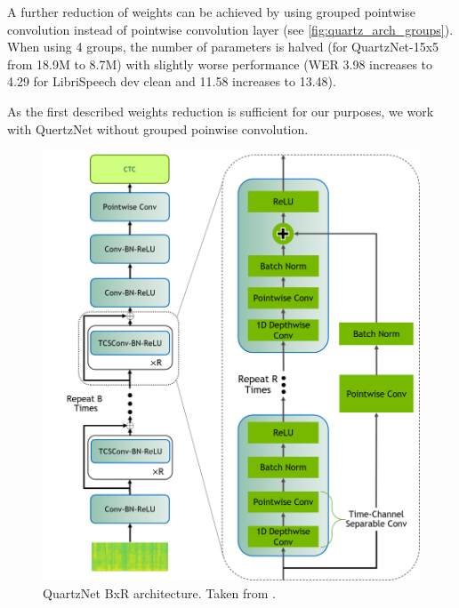 A further reduction of weights can be achieved by using grouped pointwise convolution instead of pointwise convolution layer (see  \cref{fig:quartz_arch_groups}). When using 4 groups, the number of parameters is halved (for QuartzNet-15x5 from 18.9M to 8.7M) with slightly worse performance (WER 3.98 increases to 4.29 for LibriSpeech dev clean and 11.58 increases to 13.48).

As the first described weights reduction is sufficient for our purposes, we work with QuertzNet without grouped poinwise convolution.

\begin{figure}[h]
 \centering
 \includegraphics[width=\linewidth]{img/QuartzNet_v2.png}
 \caption{QuartzNet BxR architecture. Taken from .}
 \label{fig:quartz_arch}
\end{figure}

